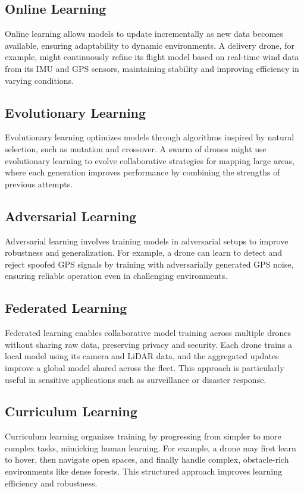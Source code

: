 \subsection{Online Learning}
Online learning allows models to update incrementally as new data becomes available, ensuring adaptability to dynamic environments. A delivery drone, for example, might continuously refine its flight model based on real-time wind data from its IMU and GPS sensors, maintaining stability and improving efficiency in varying conditions. 

\subsection{Evolutionary Learning}
Evolutionary learning optimizes models through algorithms inspired by natural selection, such as mutation and crossover. A swarm of drones might use evolutionary learning to evolve collaborative strategies for mapping large areas, where each generation improves performance by combining the strengths of previous attempts. 

\subsection{Adversarial Learning}
Adversarial learning involves training models in adversarial setups to improve robustness and generalization. For example, a drone can learn to detect and reject spoofed GPS signals by training with adversarially generated GPS noise, ensuring reliable operation even in challenging environments. 

\subsection{Federated Learning}
Federated learning enables collaborative model training across multiple drones without sharing raw data, preserving privacy and security. Each drone trains a local model using its camera and LiDAR data, and the aggregated updates improve a global model shared across the fleet. This approach is particularly useful in sensitive applications such as surveillance or disaster response. 

\subsection{Curriculum Learning}
Curriculum learning organizes training by progressing from simpler to more complex tasks, mimicking human learning. For example, a drone may first learn to hover, then navigate open spaces, and finally handle complex, obstacle-rich environments like dense forests. This structured approach improves learning efficiency and robustness. 

